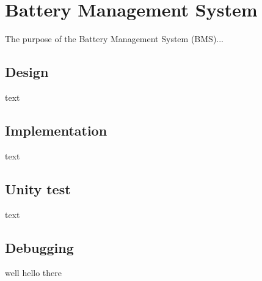 \section{Battery Management System}
The purpose of the Battery Management System (BMS)...

\subsection{Design}
text

\subsection{Implementation}
text

\subsection{Unity test}
text

\subsection{Debugging}
well hello there